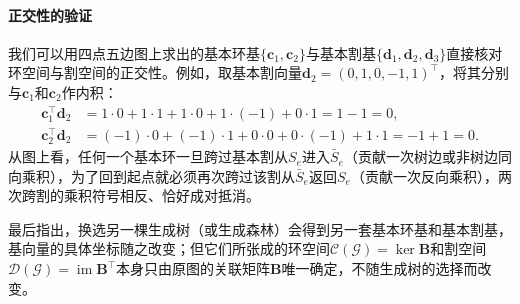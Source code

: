 \paragraph{正交性的验证}

我们可以用四点五边图上求出的基本环基$\{\bm{c}_1,\bm{c}_2\}$与基本割基$\{\bm{d}_1,\bm{d}_2,\bm{d}_3\}$直接核对环空间与割空间的正交性。例如，取基本割向量$\bm{d}_2=(0,1,0,-1,1)^\top$，将其分别与$\bm{c}_1$和$\bm{c}_2$作内积：
\[
\begin{aligned}
\bm{c}_1^\top\bm{d}_2&=1\cdot0+1\cdot1+1\cdot0+1\cdot(-1)+0\cdot1=1-1=0,\\
\bm{c}_2^\top\bm{d}_2&=(-1)\cdot0+(-1)\cdot1+0\cdot0+0\cdot(-1)+1\cdot1=-1+1=0.
\end{aligned}
\]
从图上看，任何一个基本环一旦跨过基本割从$S_e$进入$\bar{S}_e$（贡献一次树边或非树边同向乘积），为了回到起点就必须再次跨过该割从$\bar{S}_e$返回$S_e$（贡献一次反向乘积），两次跨割的乘积符号相反、恰好成对抵消。

最后指出，换选另一棵生成树（或生成森林）会得到另一套基本环基和基本割基，基向量的具体坐标随之改变；但它们所张成的环空间$\mathcal{C}(\mathcal{G})=\ker\bm{B}$和割空间$\mathcal{D}(\mathcal{G})=\operatorname{im}\bm{B}^\top$本身只由原图的关联矩阵$\bm{B}$唯一确定，不随生成树的选择而改变。
